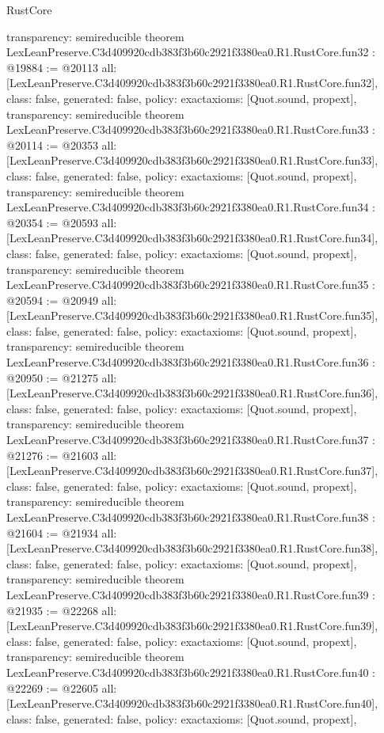 \begin{lexlean}{RustCore}
\begin{coremodule}
{  transparency: semireducible
}
theorem LexLeanPreserve.C3d409920cdb383f3b60c2921f3380ea0.R1.RustCore.fun32 : @19884 := @20113 {
  all: [LexLeanPreserve.C3d409920cdb383f3b60c2921f3380ea0.R1.RustCore.fun32],
  class: false,
  generated: false,
  policy: exact{axioms: [Quot.sound, propext]},
  transparency: semireducible
}
theorem LexLeanPreserve.C3d409920cdb383f3b60c2921f3380ea0.R1.RustCore.fun33 : @20114 := @20353 {
  all: [LexLeanPreserve.C3d409920cdb383f3b60c2921f3380ea0.R1.RustCore.fun33],
  class: false,
  generated: false,
  policy: exact{axioms: [Quot.sound, propext]},
  transparency: semireducible
}
theorem LexLeanPreserve.C3d409920cdb383f3b60c2921f3380ea0.R1.RustCore.fun34 : @20354 := @20593 {
  all: [LexLeanPreserve.C3d409920cdb383f3b60c2921f3380ea0.R1.RustCore.fun34],
  class: false,
  generated: false,
  policy: exact{axioms: [Quot.sound, propext]},
  transparency: semireducible
}
theorem LexLeanPreserve.C3d409920cdb383f3b60c2921f3380ea0.R1.RustCore.fun35 : @20594 := @20949 {
  all: [LexLeanPreserve.C3d409920cdb383f3b60c2921f3380ea0.R1.RustCore.fun35],
  class: false,
  generated: false,
  policy: exact{axioms: [Quot.sound, propext]},
  transparency: semireducible
}
theorem LexLeanPreserve.C3d409920cdb383f3b60c2921f3380ea0.R1.RustCore.fun36 : @20950 := @21275 {
  all: [LexLeanPreserve.C3d409920cdb383f3b60c2921f3380ea0.R1.RustCore.fun36],
  class: false,
  generated: false,
  policy: exact{axioms: [Quot.sound, propext]},
  transparency: semireducible
}
theorem LexLeanPreserve.C3d409920cdb383f3b60c2921f3380ea0.R1.RustCore.fun37 : @21276 := @21603 {
  all: [LexLeanPreserve.C3d409920cdb383f3b60c2921f3380ea0.R1.RustCore.fun37],
  class: false,
  generated: false,
  policy: exact{axioms: [Quot.sound, propext]},
  transparency: semireducible
}
theorem LexLeanPreserve.C3d409920cdb383f3b60c2921f3380ea0.R1.RustCore.fun38 : @21604 := @21934 {
  all: [LexLeanPreserve.C3d409920cdb383f3b60c2921f3380ea0.R1.RustCore.fun38],
  class: false,
  generated: false,
  policy: exact{axioms: [Quot.sound, propext]},
  transparency: semireducible
}
theorem LexLeanPreserve.C3d409920cdb383f3b60c2921f3380ea0.R1.RustCore.fun39 : @21935 := @22268 {
  all: [LexLeanPreserve.C3d409920cdb383f3b60c2921f3380ea0.R1.RustCore.fun39],
  class: false,
  generated: false,
  policy: exact{axioms: [Quot.sound, propext]},
  transparency: semireducible
}
theorem LexLeanPreserve.C3d409920cdb383f3b60c2921f3380ea0.R1.RustCore.fun40 : @22269 := @22605 {
  all: [LexLeanPreserve.C3d409920cdb383f3b60c2921f3380ea0.R1.RustCore.fun40],
  class: false,
  generated: false,
  policy: exact{axioms: [Quot.sound, propext]},
}
\end{coremodule}
\end{lexlean}

